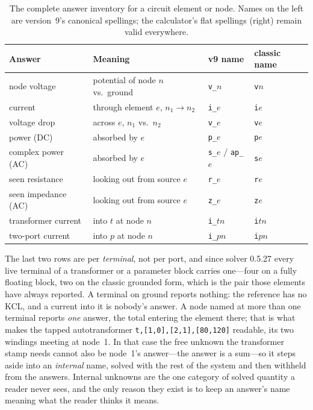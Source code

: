 \documentclass[11pt,oneside]{report}
\newcommand{\code}[1]{\texttt{#1}}
\begin{document}
\begin{table}[htbp]
\caption{The complete answer inventory for a circuit element or node.
Names on the left are version~9's canonical spellings; the
calculator's flat spellings (right) remain valid everywhere.}
\label{tab:names}
\centering
\begin{tabular}{@{}llll@{}}
\toprule
Answer & Meaning & v9 name & classic name \\
\midrule
node voltage & potential of node $n$ vs.\ ground & \code{v\_$n$} & \code{v$n$} \\
current & through element $e$, $n_1 \to n_2$ & \code{i\_$e$} & \code{i$e$} \\
voltage drop & across $e$, $n_1$ vs.\ $n_2$ & \code{v\_$e$} & \code{v$e$} \\
power (DC) & absorbed by $e$ & \code{p\_$e$} & \code{p$e$} \\
complex power (AC) & absorbed by $e$ & \code{s\_$e$} / \code{ap\_$e$} & \code{s$e$} \\
seen resistance & looking out from source $e$ & \code{r\_$e$} & \code{r$e$} \\
seen impedance (AC) & looking out from source $e$ & \code{z\_$e$} & \code{z$e$} \\
transformer current & into $t$ at node $n$ & \code{i\_$t$$n$} & \code{i$t$$n$} \\
two-port current & into $p$ at node $n$ & \code{i\_$p$$n$} & \code{i$p$$n$} \\
\bottomrule
\end{tabular}
\end{table}

The last two rows are per \emph{terminal}, not per port, and since
solver 0.5.27 every live terminal of a transformer or a parameter
block carries one---four on a fully floating block, two on the classic
grounded form, which is the pair those elements have always reported.
A terminal on ground reports nothing: the reference has no KCL, and a
current into it is nobody's answer. A node named at more than one
terminal reports \emph{one} answer, the total entering the element
there; that is what makes the tapped autotransformer
\code{t,[1,0],[2,1],[80,120]} readable, its two windings meeting at
node~1. In that case the free unknown the transformer stamp needs
cannot also be node~1's answer---the answer is a sum---so it steps
aside into an \emph{internal} name, solved with the rest of the system
and then withheld from the answers. Internal unknowns are the one
category of solved quantity a reader never sees, and the only reason
they exist is to keep an answer's name meaning what the reader thinks
it means.
\end{document}
